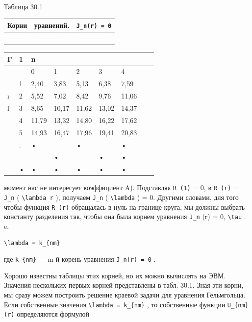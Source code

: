 \documentclass[
  ukrainian,
]{article}
\newcounter{none} %
\begin{document}
Таблица 30.1

{\def\LTcaptype{none} %
\begin{longtable}[]{@{}lll@{}}
\toprule\noalign{}
Корни & уравнений. & \texttt{J\_n(r)\ =\ 0} \\
\midrule\noalign{}
\endhead
\bottomrule\noalign{}
\endlastfoot
------- & ------------ & -------------- \\
\end{longtable}
}

{\def\LTcaptype{none} %
\begin{longtable}[]{@{}lllllllll@{}}
\toprule\noalign{}
Γ & 1 & n & & & & & & \\
\midrule\noalign{}
\endhead
\bottomrule\noalign{}
\endlastfoot
& & 0 & 1 & 2 & 3 & 4 & & \\
& 1 & 2,40 & 3,83 & 5,13 & 6,38 & 7,59 & & \\
ı & 2 & 5,52 & 7,02 & 8,42 & 9,76 & 11,06 & & \\
ľ & 3 & 8,65 & 10,17 & 11,62 & 13,02 & 14,37 & & \\
& 4 & 11,79 & 13,32 & 14,80 & 16,22 & 17,62 & & \\
& 5 & 14,93 & 16,47 & 17,96 & 19,41 & 20,83 & & \\
& . & • & & • & & • & & \\
& & & • & & • & • & & \\
& • & • & • & • & • & • & & \\
\end{longtable}
}

момент нас не интересует коэффициент A). Подставляя \texttt{R\ (1)} = 0,
в \texttt{R\ (r)} = \texttt{J\_n} ( \texttt{\textbackslash{}lambda\ r}
), получаем \texttt{J\_n} ( \texttt{\textbackslash{}lambda} ) = 0.
Другими словами, для того чтобы функция \texttt{R\ (r)} обращалась в
нуль на границе круга, мы должны выбрать константу разделения так, чтобы
она была корнем уравнения \texttt{J\_n} (r) = 0,
\texttt{\textbackslash{}tau} . e.

\begin{verbatim}
\lambda = k_{nm}
\end{verbatim}

где \texttt{k\_\{nm\}} --- m-й корень уравнения \texttt{J\_n(r)\ =\ 0} .

Хорошо известны таблицы этих корней, но их можно вычислять на ЭВМ.
Значения нескольких первых корней представлены в табл. 30.1. Зная эти
корни, мы сразу можем построить решение краевой задачи для уравнения
Гельмгольца. Если собственные значения
\texttt{\textbackslash{}lambda\ =\ k\_\{nm\}} , то собственные функции
\texttt{U\_\{nm\}(r)} определяются формулой
\end{document}
